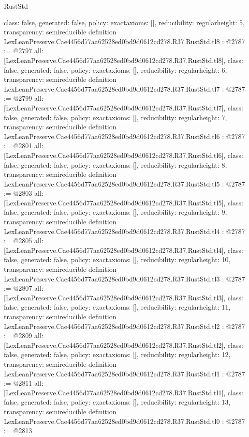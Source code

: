 \begin{lexlean}{RustStd}
\begin{coremodule}
{  class: false,
  generated: false,
  policy: exact{axioms: []},
  reducibility: regular{height: 5},
  transparency: semireducible
}
definition LexLeanPreserve.Cae4456d77aa62528ed0bd9d0612cd278.R37.RustStd.tl8 : @2787 := @2797 {
  all: [LexLeanPreserve.Cae4456d77aa62528ed0bd9d0612cd278.R37.RustStd.tl8],
  class: false,
  generated: false,
  policy: exact{axioms: []},
  reducibility: regular{height: 6},
  transparency: semireducible
}
definition LexLeanPreserve.Cae4456d77aa62528ed0bd9d0612cd278.R37.RustStd.tl7 : @2787 := @2799 {
  all: [LexLeanPreserve.Cae4456d77aa62528ed0bd9d0612cd278.R37.RustStd.tl7],
  class: false,
  generated: false,
  policy: exact{axioms: []},
  reducibility: regular{height: 7},
  transparency: semireducible
}
definition LexLeanPreserve.Cae4456d77aa62528ed0bd9d0612cd278.R37.RustStd.tl6 : @2787 := @2801 {
  all: [LexLeanPreserve.Cae4456d77aa62528ed0bd9d0612cd278.R37.RustStd.tl6],
  class: false,
  generated: false,
  policy: exact{axioms: []},
  reducibility: regular{height: 8},
  transparency: semireducible
}
definition LexLeanPreserve.Cae4456d77aa62528ed0bd9d0612cd278.R37.RustStd.tl5 : @2787 := @2803 {
  all: [LexLeanPreserve.Cae4456d77aa62528ed0bd9d0612cd278.R37.RustStd.tl5],
  class: false,
  generated: false,
  policy: exact{axioms: []},
  reducibility: regular{height: 9},
  transparency: semireducible
}
definition LexLeanPreserve.Cae4456d77aa62528ed0bd9d0612cd278.R37.RustStd.tl4 : @2787 := @2805 {
  all: [LexLeanPreserve.Cae4456d77aa62528ed0bd9d0612cd278.R37.RustStd.tl4],
  class: false,
  generated: false,
  policy: exact{axioms: []},
  reducibility: regular{height: 10},
  transparency: semireducible
}
definition LexLeanPreserve.Cae4456d77aa62528ed0bd9d0612cd278.R37.RustStd.tl3 : @2787 := @2807 {
  all: [LexLeanPreserve.Cae4456d77aa62528ed0bd9d0612cd278.R37.RustStd.tl3],
  class: false,
  generated: false,
  policy: exact{axioms: []},
  reducibility: regular{height: 11},
  transparency: semireducible
}
definition LexLeanPreserve.Cae4456d77aa62528ed0bd9d0612cd278.R37.RustStd.tl2 : @2787 := @2809 {
  all: [LexLeanPreserve.Cae4456d77aa62528ed0bd9d0612cd278.R37.RustStd.tl2],
  class: false,
  generated: false,
  policy: exact{axioms: []},
  reducibility: regular{height: 12},
  transparency: semireducible
}
definition LexLeanPreserve.Cae4456d77aa62528ed0bd9d0612cd278.R37.RustStd.tl1 : @2787 := @2811 {
  all: [LexLeanPreserve.Cae4456d77aa62528ed0bd9d0612cd278.R37.RustStd.tl1],
  class: false,
  generated: false,
  policy: exact{axioms: []},
  reducibility: regular{height: 13},
  transparency: semireducible
}
definition LexLeanPreserve.Cae4456d77aa62528ed0bd9d0612cd278.R37.RustStd.tl0 : @2787 := @2813 {
}
\end{coremodule}
\end{lexlean}
